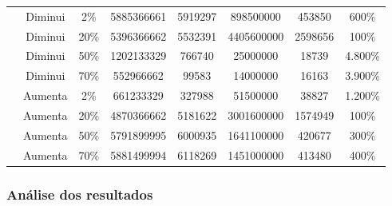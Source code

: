 \begin{table}[H]
\begin{adjustbox}{max width=\textwidth}
\begin{tabular}{|c|c|c|c|c|c|c|c|}
                                   & Diminui       & 2\%                                         & 5885366661        & 5919297         & 898500000          & 453850           & 600\%                           \\ \cline{2-8} 
                                   & Diminui       & 20\%                                        & 5396366662        & 5532391         & 4405600000         & 2598656          & 100\%                           \\ \cline{2-8} 
                                   & Diminui       & 50\%                                        & 1202133329        & 766740          & 25000000           & 18739            & 4.800\%                         \\ \cline{2-8} 
                                   & Diminui       & 70\%                                        & 552966662         & 99583           & 14000000           & 16163            & 3.900\%                         \\ \cline{2-8} 
                                   & Aumenta       & 2\%                                         & 661233329         & 327988          & 51500000           & 38827            & 1.200\%                         \\ \cline{2-8} 
                                   & Aumenta       & 20\%                                        & 4870366662        & 5181622         & 3001600000         & 1574949          & 100\%                           \\ \cline{2-8} 
                                   & Aumenta       & 50\%                                        & 5791899995        & 6000935         & 1641100000         & 420677           & 300\%                           \\ \cline{2-8} 
                                   & Aumenta       & 70\%                                        & 5881499994        & 6118269         & 1451000000         & 413480           & 400\%                           \\ \hline
\end{tabular}
\end{adjustbox}
\end{table}


\subsubsection{Análise dos resultados}
\label{sec-experimentos-dinamicos-analise}

